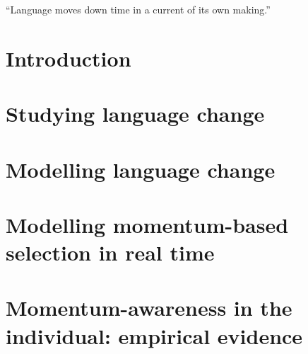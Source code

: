 \documentclass[oneside]{book}
\begin{document}
\listoffigures
\listoftables

\newpage
\thispagestyle{empty}
\epigraph{``Language moves down time in a current of its own making.''}{\citep[p.160]{Sapir1921}}

\mainmatter

\chapter{Introduction}
\label{ch:intro}


\chapter{Studying language change}
\label{ch:review}


\chapter{Modelling language change}
\label{ch:modelling}


\chapter[Modelling momentum-based selection]{Modelling momentum-based selection in real time}
\label{ch:momentummodel}


\chapter[Momentum-awareness in the individual]{Momentum-awareness in the individual: empirical evidence}
\label{ch:questionnaire}


\end{document}
